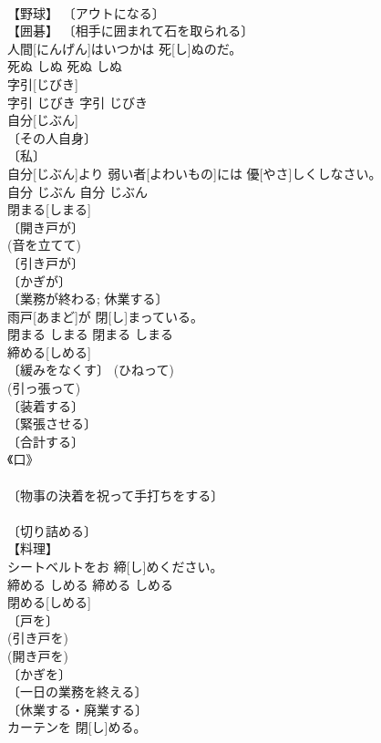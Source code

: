 \documentclass[8pt]{extreport}
\begin{document}
\begin{CJK}{UTF8}{min}
\\	【野球】 〔アウトになる〕 
\\	【囲碁】 〔相手に囲まれて石を取られる〕 
\\	人間[にんげん]はいつかは 死[し]ぬのだ。	
\\	死ぬ	しぬ	死ぬ	しぬ	
\\	字引[じびき]	
\\	字引	じびき	字引	じびき	
\\	自分[じぶん]	
\\	〔その人自身〕 
\\	〔私〕 
\\	自分[じぶん]より 弱い者[よわいもの]には 優[やさ]しくしなさい。	
\\	自分	じぶん	自分	じぶん	
\\	閉まる[しまる]	
\\	〔開き戸が〕 
\\	(音を立てて) 
\\	〔引き戸が〕 
\\	〔かぎが〕 
\\	〔業務が終わる; 休業する〕 
\\	雨戸[あまど]が 閉[し]まっている。	
\\	閉まる	しまる	閉まる	しまる	
\\	締める[しめる]	
\\	〔緩みをなくす〕 (ひねって) 
\\	(引っ張って) 
\\	〔装着する〕 
\\	〔緊張させる〕 
\\	〔合計する〕 
\\	《口》 
\\	[⇒しめて] 
\\	〔物事の決着を祝って手打ちをする〕 
\\	[⇒てじめ] 
\\	〔切り詰める〕 
\\	【料理】 
\\	シートベルトをお 締[し]めください。	
\\	締める	しめる	締める	しめる	
\\	閉める[しめる]	
\\	〔戸を〕 
\\	(引き戸を) 
\\	(開き戸を) 
\\	〔かぎを〕 
\\	〔一日の業務を終える〕 
\\	〔休業する・廃業する〕 
\\	カーテンを 閉[し]める。	

\end{CJK}
\end{document}
